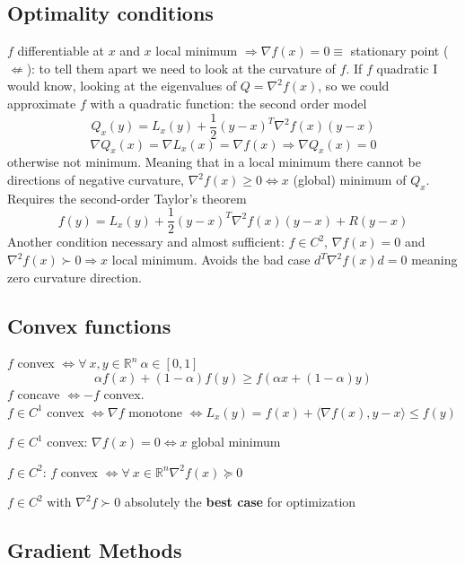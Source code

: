 \documentclass[10pt]{report}
\begin{document}
\subsection{Optimality conditions}
$f$ differentiable at $x$ and $x$ local minimum $\Rightarrow \nabla f(x) = 0 \equiv$ stationary point ($\not\Leftarrow$): to tell them apart we need to look at the curvature of $f$. If $f$ quadratic I would know, looking at the eigenvalues of $Q = \nabla^2 f(x)$, so we could approximate $f$ with a quadratic function: the second order model $$Q_x(y) = L_x(y) + \frac{1}{2}(y-x)^T\nabla^2f(x)(y-x)$$
$$\nabla Q_x(x) = \nabla L_x(x) = \nabla f(x) \Rightarrow \nabla Q_x(x) = 0$$otherwise not minimum. Meaning that in a local minimum there cannot be directions of negative curvature, $\nabla^2 f(x) \geq 0 \Leftrightarrow x$ (global) minimum of $Q_x$. Requires the second-order Taylor's theorem
$$f(y) = L_x(y) + \frac{1}{2}(y-x)^T\nabla^2 f(x)(y-x) + R(y-x)$$
Another condition necessary and almost sufficient: $f\in C^2$, $\nabla f(x) = 0$ and $\nabla^2f(x)\succ 0\Rightarrow x$ local minimum. Avoids the bad case $d^T\nabla^2f(x)d=0$ meaning zero curvature direction.
\subsection{Convex functions}
$f$ convex $\Leftrightarrow \forall\:x,y\in\mathbb{R}^n\:\alpha\in [0,1]$
$$\alpha f(x) + (1-\alpha)f(y)\geq f(\alpha x+(1-\alpha)y)$$
$f$ concave $\Leftrightarrow -f$ convex.\\
$f\in C^1$ convex $\Leftrightarrow\nabla f$ monotone $\Leftrightarrow L_x(y) = f(x)+\langle\nabla f(x), y-x\rangle\leq f(y)$
\begin{list}{}{}
	\item $f\in C^1$ convex: $\nabla f(x) = 0\Leftrightarrow x$ global minimum
	\item $f\in C^2$: $f$ convex $\Leftrightarrow\forall\:x\in\mathbb{R}^n \nabla^2 f(x)\succeq 0$
	\item $f\in C^2$ with $\nabla^2 f\succ 0$ absolutely the \textbf{best case} for optimization
\end{list}
\subsection{Gradient Methods}
\end{document}
